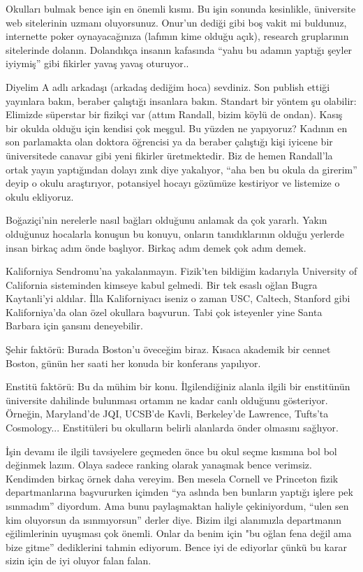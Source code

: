 \documentclass[12pt]{article}
\begin{document}
Okulları bulmak bence işin en önemli kısmı. Bu işin sonunda kesinlikle, üniversite web sitelerinin uzmanı oluyorsunuz. Onur'un dediği gibi boş vakit mi buldunuz, internette poker oynayacağınıza (lafımın kime olduğu açık), research gruplarının sitelerinde dolanın. Dolandıkça insanın kafasında ``yahu bu adamın yaptığı şeyler iyiymiş'' gibi fikirler yavaş yavaş oturuyor.. 

Diyelim A adlı arkadaşı (arkadaş dediğim hoca) sevdiniz. Son publish ettiği yayınlara bakın, beraber çalıştığı insanlara bakın. Standart bir yöntem şu olabilir: Elimizde süperstar bir fizikçi var (attım Randall, bizim köylü de ondan). Kasış bir okulda olduğu için kendisi çok meşgul. Bu yüzden ne yapıyoruz? Kadının en son parlamakta olan doktora öğrencisi ya da beraber çalıştığı kişi iyicene bir üniversitede canavar gibi yeni fikirler üretmektedir. Biz de hemen Randall'la ortak yayın yaptığından dolayı zınk diye yakalıyor, “aha ben bu okula da girerim” deyip o okulu araştırıyor, potansiyel hocayı gözümüze kestiriyor ve listemize o okulu ekliyoruz. 

Boğaziçi'nin nerelerle nasıl bağları olduğunu anlamak da çok yararlı. Yakın olduğunuz hocalarla konuşun bu konuyu, onların tanıdıklarının olduğu yerlerde insan birkaç adım önde başlıyor. Birkaç adım demek çok adım demek. 

Kaliforniya Sendromu'na yakalanmayın. Fizik'ten bildiğim kadarıyla University of California sisteminden kimseye kabul gelmedi. Bir tek esaslı oğlan Bugra Kaytanli'yi aldılar. İlla Kaliforniyacı iseniz o zaman USC, Caltech, Stanford gibi Kaliforniya'da olan özel okullara başvurun. Tabi çok isteyenler yine Santa Barbara için şansını deneyebilir. 

Şehir faktörü: Burada Boston'u öveceğim biraz. Kısaca akademik bir cennet Boston, günün her saati her konuda bir konferans yapılıyor. 

Enstitü faktörü: Bu da mühim bir konu. İlgilendiğiniz alanla ilgili bir enstitünün üniversite dahilinde bulunması ortamın ne kadar canlı olduğunu gösteriyor. Örneğin, Maryland'de JQI, UCSB'de Kavli, Berkeley'de Lawrence, Tufts'ta Cosmology... Enstitüleri bu okulların belirli alanlarda önder olmasını sağlıyor. 

İşin devamı ile ilgili tavsiyelere geçmeden önce bu okul seçme kısmına bol bol değinmek lazım. Olaya sadece ranking olarak yanaşmak bence verimsiz. Kendimden birkaç örnek daha vereyim.  
Ben mesela Cornell ve Princeton fizik departmanlarına başvururken içimden ``ya aslında ben bunların yaptığı işlere pek ısınmadım'' diyordum. Ama bunu paylaşmaktan haliyle çekiniyordum, “ulen sen kim oluyorsun da ısınmıyorsun” derler diye. Bizim ilgi alanımızla departmanın eğilimlerinin uyuşması çok önemli. Onlar da benim için "bu oğlan fena değil ama bize gitme'' dediklerini tahmin ediyorum. Bence iyi de ediyorlar çünkü bu karar sizin için de iyi oluyor falan falan. 
\end{document}
